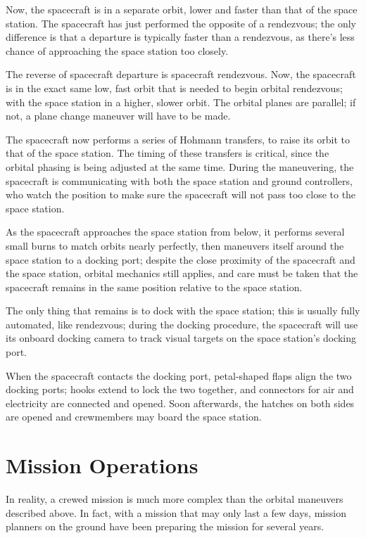 \documentclass[oneside,a5paper]{book}
\newcommand{\afterchapter}{\vspace{1em}}
\begin{document}
Now, the spacecraft is in a separate orbit, lower and faster than that
of the space station. The spacecraft has just performed the opposite
of a rendezvous; the only difference is that a departure is typically
faster than a rendezvous, as there’s less chance of approaching the
space station too closely.

The reverse of spacecraft departure is spacecraft rendezvous. Now, the
spacecraft is in the exact same low, fast orbit that is needed to
begin orbital rendezvous; with the space station in a higher, slower
orbit. The orbital planes are parallel; if not, a plane change
maneuver will have to be made.

The spacecraft now performs a series of Hohmann transfers, to raise
its orbit to that of the space station. The timing of these transfers
is critical, since the orbital phasing is being adjusted at the same
time. During the maneuvering, the spacecraft is communicating with
both the space station and ground controllers, who watch the position
to make sure the spacecraft will not pass too close to the space
station.

As the spacecraft approaches the space station from below, it performs
several small burns to match orbits nearly perfectly, then maneuvers
itself around the space station to a docking port; despite the close
proximity of the spacecraft and the space station, orbital mechanics
still applies, and care must be taken that the spacecraft remains in
the same position relative to the space station.

The only thing that remains is to dock with the space station; this is
usually fully automated, like rendezvous; during the docking
procedure, the spacecraft will use its onboard docking camera to track
visual targets on the space station’s docking port.

When the spacecraft contacts the docking port, petal-shaped flaps
align the two docking ports; hooks extend to lock the two together,
and connectors for air and electricity are connected and opened. Soon
afterwards, the hatches on both sides are opened and crewmembers may
board the space station.

\chapter{Mission Operations}

\afterchapter

In reality, a crewed mission is much more complex than the orbital
maneuvers described above. In fact, with a mission that may only last
a few days, mission planners on the ground have been preparing the
mission for several years.
\end{document}
